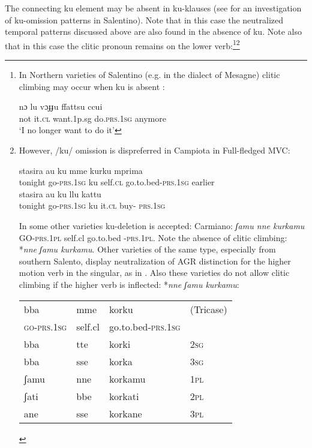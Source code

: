 \documentclass[output=paper]{langscibook}
\begin{document}
The connecting ku element may be absent in ku-klauses (see \citet{ledgeway2015a} for an investigation of ku-omission patterns in Salentino).  Note that in this case the neutralized temporal patterns discussed above are also found in the absence of ku. Note also that in this case the clitic pronoun remains on the lower verb:\footnote{In Northern varieties of Salentino (e.g. in the dialect of Mesagne) clitic climbing may occur when ku is absent \citep{calabrese1993a, terzi1992a, terzi1994a, terzi1996a}:

\ea \label{fn8ex}\gll nɔ  lu  vɔɟɟu  ffattsu   ccui    \\ 
 not it.\textsc{cl}  want.1p.sg  do.\textsc{prs}.\textsc{1sg}  anymore\\
 \glt `I no longer want to do it’
\z 

}\footnote{However, /ku/ omission is dispreferred in Campiota in Full-fledged MVC:

\ea \label{fn9ex}
    \ea \label{fn9exa} \gll stasira au      ku  mme    kurku       mprima\\
     tonight go-\textsc{prs}.\textsc{1sg}  ku self.\textsc{cl}  go.to.bed-\textsc{prs}.\textsc{1sg}  earlier\\
    \ex \label{fn9exb}\gll stasira  au       ku  llu   kattu\\
   tonight  go-\textsc{prs}.\textsc{1sg}  ku  it.\textsc{cl} buy- \textsc{prs}.\textsc{1sg} \\
    \z
\ex \label{fn9ex2}
    \z
\z
  
In some other varieties ku-deletion is accepted:  Carmiano: \textit{ʃamu nne kurkamu} GO-\textsc{prs}.\textsc{1pl} self.cl   go.to.bed -\textsc{prs}.\textsc{1pl}. Note the absence of clitic climbing:  *\textit{nne ʃamu kurkamu}.  Other varieties of the same type, especially from southern Salento, display neutralization of AGR distinction for the higher motion verb in the singular, as in .  Also these varieties do not allow clitic climbing if the higher verb is inflected: *\textit{nne ʃamu kurkamu}:  

\ea \label{fn9ex3}
\begin{tabular}[t]{@{}llll@{}}
bba        & mme     & korku             & (Tricase) \\
\textsc{go-prs.1sg} & self.cl & go.to.bed-\textsc{prs.1sg} &    \\
bba        & tte     & korki             & \textsc{\textsc{2sg}}\\
bba        & sse     & korka             & \textsc{\textsc{3sg}}\\
ʃamu       & nne     & korkamu           & \textsc{\textsc{1pl}}\\
ʃati       & bbe     & korkati           & \textsc{\textsc{2pl}}\\
ane        & sse     & korkane           & \textsc{\textsc{3pl}}
\end{tabular}
\z}
\end{document}
